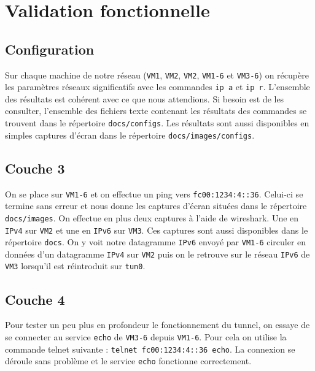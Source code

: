 \documentclass[a4paper, 12pt]{article}
\begin{document}
    \section{Validation fonctionnelle}

    \subsection{Configuration}

    Sur chaque machine de notre réseau (\verb+VM1+, \verb+VM2+, \verb+VM2+, 
    \verb+VM1-6+ et \verb+VM3-6+) on récupère les paramètres réseaux 
    significatifs avec les commandes \verb+ip a+ et \verb+ip r+. L'ensemble 
    des résultats est cohérent avec ce que nous attendions. Si besoin est de
    les consulter, l'ensemble des fichiers texte contenant les résultats des 
    commandes se trouvent dans le répertoire \verb+docs/configs+. Les résultats 
    sont aussi disponibles en simples captures d'écran dans le répertoire 
    \verb+docs/images/configs+.

    \subsection{Couche 3}

    On se place sur \verb+VM1-6+ et on effectue un ping vers \verb+fc00:1234:4::36+.
    Celui-ci se termine sans erreur et nous donne les captures d'écran situées dans 
    le répertoire \verb+docs/images+. On effectue en plus deux captures à l'aide de 
    wireshark. Une en \verb+IPv4+ sur \verb+VM2+ et une en \verb+IPv6+ sur \verb+VM3+.
    Ces captures sont aussi disponibles dans le répertoire \verb+docs+. On y voit 
    notre datagramme \verb+IPv6+ envoyé par \verb+VM1-6+ circuler en données d'un 
    datagramme \verb+IPv4+ sur \verb+VM2+ puis on le retrouve sur le réseau 
    \verb+IPv6+ de \verb+VM3+ lorsqu'il est réintroduit sur \verb+tun0+.

    \subsection{Couche 4}

    Pour tester un peu plus en profondeur le fonctionnement du tunnel, on essaye
    de se connecter au service \verb+echo+ de \verb+VM3-6+ depuis \verb+VM1-6+.
    Pour cela on utilise la commande telnet suivante : 
    \verb+telnet fc00:1234:4::36 echo+. La connexion se déroule sans problème 
    et le service \verb+echo+ fonctionne correctement.
\end{document}

